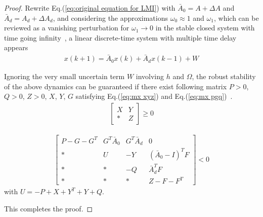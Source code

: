 \documentclass[10pt,final,journal]{IEEEtran}
\begin{document}
\begin{proof}
	Rewrite Eq.(\ref{eq:original equation for LMI}) with $\bar A_0=A+\Delta A$ and $\bar A_d=A_d+\Delta A_d$, and considering the approximations $\omega_0\approx 1$ and $\omega_1$, which can be reviewed as a vanishing perturbation for $\omega_1\to 0$ in the stable closed system with time going infinity~\cite{Xu2008}, a linear discrete-time system with multiple time delay appears   
	\begin{align}
		x(k+1) = \bar A_0x(k)+\bar A_dx(k-1)+W
	\end{align}
	
	Ignoring the very small uncertain term $W$ involving $h$ and $\Omega$, the robust stability of the above dynamics can be guaranteed if there exist following matrix $P>0$, $Q>0$, $Z>0$, $X$, $Y$, $G$ satisfying Eq.(\ref{eq:mx xyz}) and Eq.(\ref{eq:mx pgq})~\cite{Gao2004}.
	\begin{align}\label{eq:mx xyz}  
		\begin{bmatrix}
			X &Y\\ * &Z
		\end{bmatrix}\ge 0
	\end{align}

		\begin{align}\label{eq:mx pgq}
			\begin{bmatrix}
				P-G-G^T &G^T\bar A_0 	&G^T\bar A_d 	&0\\
				 * 		&U	&-Y				&(\bar A_0-I)^TF\\
				 *		&*				&-Q				&\bar A_d^TF\\
				 *		&*				&*				&Z-F-F^T
			\end{bmatrix}< 0
		\end{align}
		with $U=-P+X+Y^T+Y+Q$.

    This completes the proof.\end{proof}

	
\end{document}
